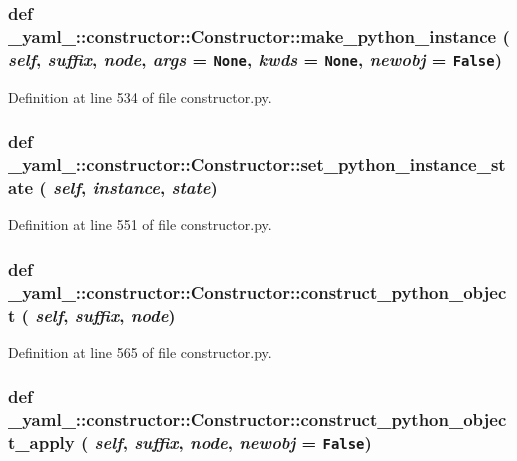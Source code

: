 \subsubsection{\setlength{\rightskip}{0pt plus 5cm}def \_\-yaml\_\-::constructor::Constructor::make\_\-python\_\-instance ( {\em self},  {\em suffix},  {\em node},  {\em args} = {\tt None},  {\em kwds} = {\tt None},  {\em newobj} = {\tt False})}\label{class__yaml___1_1constructor_1_1Constructor_417b1c12f4a8bfe1afdd552a280906c7}




Definition at line 534 of file constructor.py.
\subsubsection{\setlength{\rightskip}{0pt plus 5cm}def \_\-yaml\_\-::constructor::Constructor::set\_\-python\_\-instance\_\-state ( {\em self},  {\em instance},  {\em state})}\label{class__yaml___1_1constructor_1_1Constructor_931c008e92bfd4e4cbfcdc8a0de18923}




Definition at line 551 of file constructor.py.
\subsubsection{\setlength{\rightskip}{0pt plus 5cm}def \_\-yaml\_\-::constructor::Constructor::construct\_\-python\_\-object ( {\em self},  {\em suffix},  {\em node})}\label{class__yaml___1_1constructor_1_1Constructor_aafc3e6a49b88e156c61f31c277b1128}




Definition at line 565 of file constructor.py.
\subsubsection{\setlength{\rightskip}{0pt plus 5cm}def \_\-yaml\_\-::constructor::Constructor::construct\_\-python\_\-object\_\-apply ( {\em self},  {\em suffix},  {\em node},  {\em newobj} = {\tt False})}\label{class__yaml___1_1constructor_1_1Constructor_74df068ea146c1977d677b1f89d85ebc}




